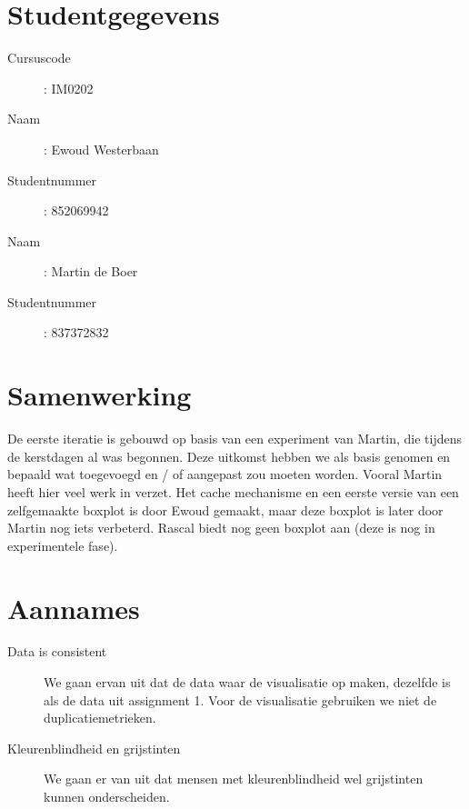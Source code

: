 \documentclass[a4paper]{article}
\begin{document}
\pagestyle{fancy}

\section*{Studentgegevens}
\begin{description}
	\item [Cursuscode]: IM0202
	\item [Naam]: Ewoud Westerbaan
	\item [Studentnummer]: 852069942
	\item [Naam]: Martin de Boer
	\item [Studentnummer]: 837372832
\end{description}

\section{Samenwerking}
De eerste iteratie is gebouwd op basis van een experiment van Martin, die tijdens de kerstdagen al was begonnen. Deze uitkomst hebben we als basis genomen en bepaald wat toegevoegd en / of aangepast zou moeten worden. Vooral Martin heeft hier veel werk in verzet.
Het cache mechanisme en een eerste versie van een zelfgemaakte boxplot is door Ewoud gemaakt, maar deze boxplot is later door Martin nog iets verbeterd. Rascal biedt nog geen boxplot aan (deze is nog in experimentele fase).


\section{Aannames}
\begin{description}
\item[Data is consistent] We gaan ervan uit dat de data waar de visualisatie op maken, dezelfde is als de data uit assignment 1. Voor de visualisatie gebruiken we niet de duplicatiemetrieken.
\item[Kleurenblindheid en grijstinten] We gaan er van uit dat mensen met kleurenblindheid wel grijstinten kunnen onderscheiden.
\end{description}
\end{document}
